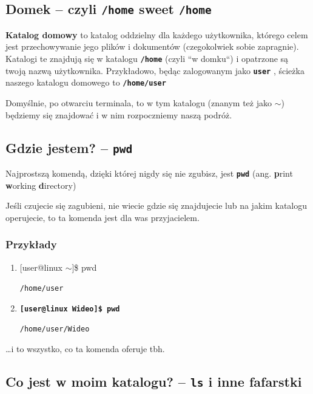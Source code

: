 \documentclass[12pt]{article}
\makeatletter
\newcommand{\ttbf}[1]{
    \texttt{\textbf{#1}}
}
\newenvironment{console1}
{
    \ttfamily
    \fontseries{b}
    \selectfont
    {[}user@linux $\sim${]}\$} {

}
\makeatother
\begin{document}
\subsection{Domek -- czyli \ttbf{/home} sweet \ttbf{/home}}
\label{sec:homedir}

\textbf{Katalog domowy} to katalog oddzielny dla każdego użytkownika, którego celem jest przechowywanie jego plików i dokumentów (czegokolwiek sobie zapragnie). Katalogi te znajdują się w katalogu \ttbf{/home} (czyli ``w domku``) i opatrzone są twoją nazwą użytkownika. Przykładowo, będąc zalogowanym jako \ttbf{user}, ścieżka naszego katalogu domowego to \ttbf{/home/user}

Domyślnie, po otwarciu terminala, to w tym katalogu (znanym też jako $\sim$) będziemy się znajdować i w nim rozpoczniemy naszą podróż.

\subsection{Gdzie jestem? -- \ttbf{pwd}}

Najprostszą komendą, dzięki której nigdy się nie zgubisz, jest \ttbf{pwd} (ang. \textbf{p}rint \textbf{w}orking \textbf{d}irectory)

Jeśli czujecie się zagubieni, nie wiecie gdzie się znajdujecie lub na jakim katalogu operujecie, to ta komenda jest dla was przyjacielem.

\subsubsection{Przykłady}

\begin{enumerate}
    \item \begin{console1}
        pwd
    \end{console1}
    
    \texttt{/home/user}

    \item \ttbf{[user@linux Wideo]\$ pwd}

    \texttt{/home/user/Wideo}
\end{enumerate}

\dots i to wszystko, co ta komenda oferuje tbh.

\subsection{Co jest w moim katalogu? -- \ttbf{ls} i inne fafarstki}
\label{sec:ls}
\end{document}
